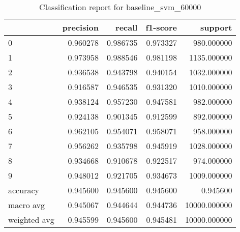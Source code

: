\begin{table}[htb!]
\centering
\caption{Classification report for baseline_svm_60000}
\label{tab:classification-report-baseline_svm_60000}
\begin{tabular}{lrrrr}
\toprule
 & precision & recall & f1-score & support \\
\midrule
0 & 0.960278 & 0.986735 & 0.973327 & 980.000000 \\
1 & 0.973958 & 0.988546 & 0.981198 & 1135.000000 \\
2 & 0.936538 & 0.943798 & 0.940154 & 1032.000000 \\
3 & 0.916587 & 0.946535 & 0.931320 & 1010.000000 \\
4 & 0.938124 & 0.957230 & 0.947581 & 982.000000 \\
5 & 0.924138 & 0.901345 & 0.912599 & 892.000000 \\
6 & 0.962105 & 0.954071 & 0.958071 & 958.000000 \\
7 & 0.956262 & 0.935798 & 0.945919 & 1028.000000 \\
8 & 0.934668 & 0.910678 & 0.922517 & 974.000000 \\
9 & 0.948012 & 0.921705 & 0.934673 & 1009.000000 \\
accuracy & 0.945600 & 0.945600 & 0.945600 & 0.945600 \\
macro avg & 0.945067 & 0.944644 & 0.944736 & 10000.000000 \\
weighted avg & 0.945599 & 0.945600 & 0.945481 & 10000.000000 \\
\bottomrule
\end{tabular}
\end{table}

